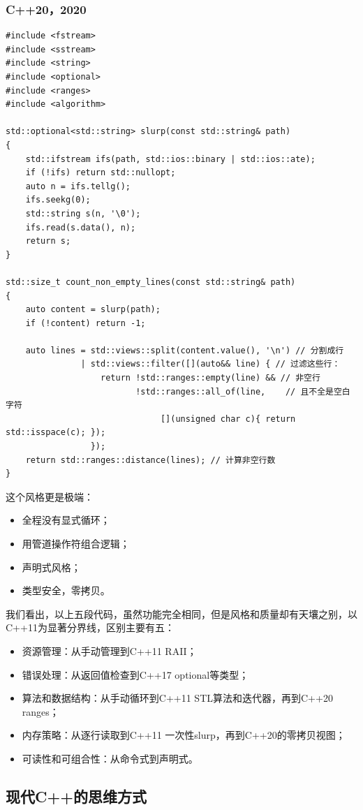 \subsubsection{C++20，2020}
\begin{verbatim}
#include <fstream>
#include <sstream>
#include <string>
#include <optional>
#include <ranges>
#include <algorithm>

std::optional<std::string> slurp(const std::string& path)
{
    std::ifstream ifs(path, std::ios::binary | std::ios::ate);
    if (!ifs) return std::nullopt;
    auto n = ifs.tellg();
    ifs.seekg(0);
    std::string s(n, '\0');
    ifs.read(s.data(), n);
    return s;
}

std::size_t count_non_empty_lines(const std::string& path)
{
    auto content = slurp(path);
    if (!content) return -1;

    auto lines = std::views::split(content.value(), '\n') // 分割成行
               | std::views::filter([](auto&& line) { // 过滤这些行：
                   return !std::ranges::empty(line) && // 非空行
                          !std::ranges::all_of(line,    // 且不全是空白字符
                               [](unsigned char c){ return std::isspace(c); });
                 });
    return std::ranges::distance(lines); // 计算非空行数
}
\end{verbatim}
这个风格更是极端：
\begin{itemize}
  \item 全程没有显式循环；
  \item 用管道操作符组合逻辑；
  \item 声明式风格；
  \item 类型安全，零拷贝。
\end{itemize}

我们看出，以上五段代码，虽然功能完全相同，但是风格和质量却有天壤之别，以C++11为显著分界线，区别主要有五：
\begin{itemize}
  \item 资源管理：从手动管理到C++11 RAII；
  \item 错误处理：从返回值检查到C++17 optional等类型；
  \item 算法和数据结构：从手动循环到C++11 STL算法和迭代器，再到C++20 ranges；
  \item 内存策略：从逐行读取到C++11 一次性slurp，再到C++20的零拷贝视图；
  \item 可读性和可组合性：从命令式到声明式。
\end{itemize}


\subsection{现代C++的思维方式}

